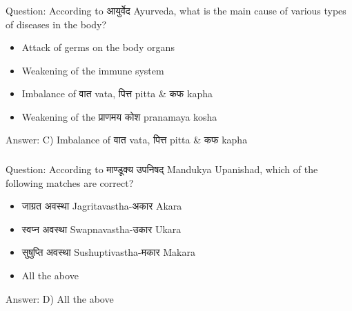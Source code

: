 %
%
%

\begin{frame}[fragile]\frametitle{}

Question: According to आयुर्वेद Ayurveda, what is the main cause of various types of diseases in the body?

\begin{itemize}
\item[A)] Attack of germs on the body organs
\item[B)] Weakening of the immune system
\item[C)] Imbalance of वात vata, पित्त pitta \& कफ kapha
\item[D)] Weakening of the प्राणमय कोश pranamaya kosha
\end{itemize}

Answer: C) Imbalance of वात vata, पित्त pitta \& कफ kapha
\end{frame}

\begin{frame}[fragile]\frametitle{}

Question: According to माण्डूक्य उपनिषद् Mandukya Upanishad, which of the following matches are correct?

\begin{itemize}
\item[A)] जाग्रत अवस्था Jagritavastha-अकार Akara
\item[B)] स्वप्न अवस्था Swapnavastha-उकार Ukara
\item[C)] सुषुप्ति अवस्था Sushuptivastha-मकार Makara
\item[D)] All the above
\end{itemize}

Answer: D) All the above
\end{frame}

